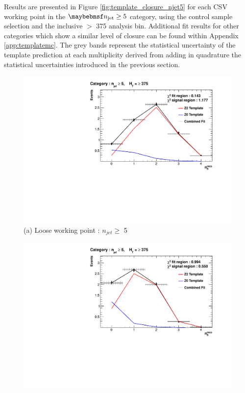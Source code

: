 Results are presented in Figure \ref{fig:template_closure_njet5} for each \ac{CSV} working point in the $\njet \geq 5$ category, using the \mupjets control sample selection and the inclusive \theht$>$ 375 \GeV analysis bin. Additional fit results for other \njet categories which show a similar level of closure can be found within Appendix \ref{app:templatemc}.  The grey bands represent the statistical uncertainty of the template prediction at each \nbreco multiplicity derived from adding in quadrature the statistical uncertainties introduced in the previous section.

\begin{figure}[ht]
\footnotesize
\vspace{5mm}
\centering
\begin{minipage}{.51\textwidth}
\centering
\includegraphics[width = 1.0\linewidth]{plots/ThesisPlots/Final_Fit_To_MC_Normal_Loose_HTBin_OneMuon_Template_375_jet_mult_5.pdf}
\centering (a) Loose working point : $n_{jet} \geq$  5 
\end{minipage}
\quad
\begin{minipage}[b]{0.51\linewidth}
\includegraphics[width = 1.0\linewidth]{plots/ThesisPlots/Final_Fit_To_MC_Normal_Medium_HTBin_OneMuon_Template_375_jet_mult_5.pdf}

\end{minipage}
\end{figure}
